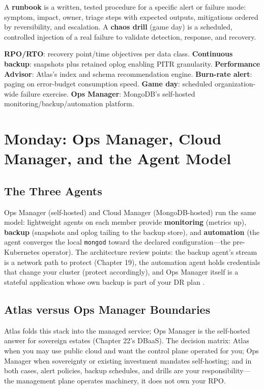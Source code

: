 \begin{definitionbox}
A \textbf{runbook} is a written, tested procedure for a specific alert or failure mode: symptom, impact, owner, triage steps with expected outputs, mitigations ordered by reversibility, and escalation. A \textbf{chaos drill} (game day) is a scheduled, controlled injection of a real failure to validate detection, response, and recovery.
\end{definitionbox}

\begin{keyterms}
\textbf{RPO/RTO}: recovery point/time objectives per data class. \textbf{Continuous backup}: snapshots plus retained oplog enabling PITR granularity. \textbf{Performance Advisor}: Atlas's index and schema recommendation engine. \textbf{Burn-rate alert}: paging on error-budget consumption speed. \textbf{Game day}: scheduled organization-wide failure exercise. \textbf{Ops Manager}: MongoDB's self-hosted monitoring/backup/automation platform.
\end{keyterms}

\section{Monday: Ops Manager, Cloud Manager, and the Agent Model}
\subsection{The Three Agents}
Ops Manager (self-hosted) and Cloud Manager (MongoDB-hosted) run the same model: lightweight agents on each member provide \textbf{monitoring} (metrics up), \textbf{backup} (snapshots and oplog tailing to the backup store), and \textbf{automation} (the agent converges the local \texttt{mongod} toward the declared configuration---the pre-Kubernetes operator). The architecture review points: the backup agent's stream is a network path to protect (Chapter 19), the automation agent holds credentials that change your cluster (protect accordingly), and Ops Manager itself is a stateful application whose own backup is part of your DR plan \cite{mongodbOpsManagerDocs}.

\subsection{Atlas versus Ops Manager Boundaries}
Atlas folds this stack into the managed service; Ops Manager is the self-hosted answer for sovereign estates (Chapter 22's DBaaS). The decision matrix: Atlas when you may use public cloud and want the control plane operated for you; Ops Manager when sovereignty or existing investment mandates self-hosting; and in both cases, alert policies, backup schedules, and drills are your responsibility---the management plane operates machinery, it does not own your RPO.

